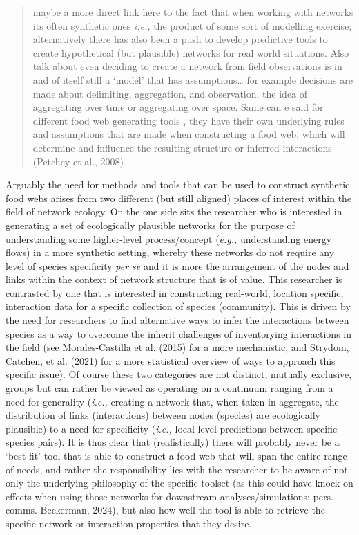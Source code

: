\documentclass[
]{article}
\begin{document}
\begin{quote}
maybe a more direct link here to the fact that when working with
networks its often synthetic ones \emph{i.e.,} the product of some sort
of modelling exercise; alternatively there has also been a push to
develop predictive tools to create hypothetical (but plausible) networks
for real world situations. Also talk about even deciding to create a
network from field observations is in and of itself still a `model' that
has assumptions\ldots{} for example decisions are made about delimiting,
aggregation, and observation, the idea of aggregating over time or
aggregating over space. Same can e said for different food web
generating tools , they have their own underlying rules and assumptions
that are made when constructing a food web, which will determine and
influence the resulting structure or inferred interactions (Petchey et
al., 2008)
\end{quote}

Arguably the need for methods and tools that can be used to construct
synthetic food webs arises from two different (but still aligned) places
of interest within the field of network ecology. On the one side sits
the researcher who is interested in generating a set of ecologically
plausible networks for the purpose of understanding some higher-level
process/concept (\emph{e.g.,} understanding energy flows) in a more
synthetic setting, whereby these networks do not require any level of
species specificity \emph{per se} and it is more the arrangement of the
nodes and links within the context of network structure that is of
value. This researcher is contrasted by one that is interested in
constructing real-world, location specific, interaction data for a
specific collection of species (community). This is driven by the need
for researchers to find alternative ways to infer the interactions
between species as a way to overcome the inherit challenges of
inventorying interactions in the field (see Morales-Castilla et al.
(2015) for a more mechanistic, and Strydom, Catchen, et al. (2021) for a
more statistical overview of ways to approach this specific issue). Of
course these two categories are not distinct, mutually exclusive, groups
but can rather be viewed as operating on a continuum ranging from a need
for generality (\emph{i.e.,} creating a network that, when taken in
aggregate, the distribution of links (interactions) between nodes
(species) are ecologically plausible) to a need for specificity
(\emph{i.e.,} local-level predictions between specific species pairs).
It is thus clear that (realistically) there will probably never be a
`best fit' tool that is able to construct a food web that will span the
entire range of needs, and rather the responsibility lies with the
researcher to be aware of not only the underlying philosophy of the
specific toolset (as this could have knock-on effects when using those
networks for downstream analyses/simulations; pers. comms. Beckerman,
2024), but also how well the tool is able to retrieve the specific
network or interaction properties that they desire.
\end{document}
